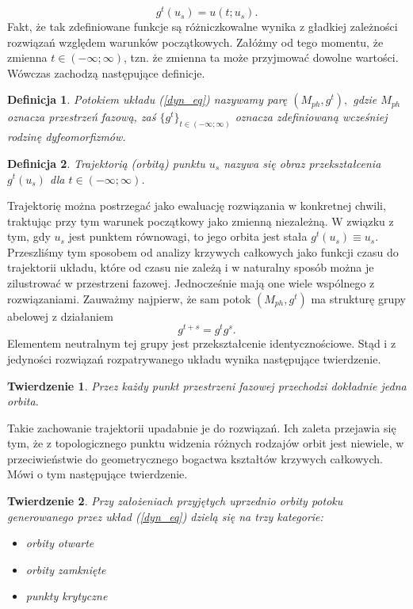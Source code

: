 \documentclass[12pt, twoside]{book}
\newtheorem{defi}{Definicja}
\newtheorem{tw}{Twierdzenie}
\begin{document}
\begin{equation}
	g^t(u_{s}) = u(t;u_{s}).
\end{equation}
Fakt, że tak zdefiniowane funkcje są różniczkowalne wynika z gładkiej zależności rozwiązań względem warunków początkowych. Załóżmy od tego momentu, że zmienna $ t \in (-\infty;\infty) $, tzn. że zmienna ta może przyjmować dowolne wartości. Wówczas zachodzą następujące definicje.
\begin{defi}
	Potokiem układu (\ref{dyn_eq}) nazywamy parę $ (M_{ph},g^t), $ gdzie $ M_{ph} $ oznacza przestrzeń fazową, zaś $ \{g^t\}_{t\in(-\infty;\infty)} $ oznacza zdefiniowaną wcześniej rodzinę dyfeomorfizmów.
\end{defi}
\begin{defi}
	Trajektorią (orbitą) punktu $ u_{s} $ nazywa się obraz przekształcenia $ g^t(u_{s}) $ dla $t\in(-\infty;\infty)  $.
\end{defi}
Trajektorię można postrzegać jako ewaluację rozwiązania w konkretnej chwili, traktując przy tym warunek początkowy jako zmienną niezależną. W związku z tym, gdy $ u_{s} $ jest punktem równowagi, to jego orbita jest stała $ g^t(u_{s}) \equiv u_{s}. $\newline
Przeszliśmy tym sposobem od analizy krzywych całkowych jako funkcji czasu do trajektorii układu, które od czasu nie zależą i w naturalny sposób można je zilustrować w przestrzeni fazowej. Jednocześnie mają one wiele wspólnego z rozwiązaniami. Zauważmy najpierw, że sam potok $ (M_{ph},g^t) $ ma strukturę grupy abelowej z działaniem
\begin{equation}
g^{t+s} = g^tg^s.
\end{equation}
Elementem neutralnym tej grupy jest przekształcenie identycznościowe. Stąd i z jedyności rozwiązań rozpatrywanego układu wynika następujące twierdzenie.
\begin{tw}
	Przez każdy punkt przestrzeni fazowej przechodzi dokładnie jedna orbita.
\end{tw}
Takie zachowanie trajektorii upadabnie je do rozwiązań. Ich zaleta przejawia się tym, że z topologicznego punktu widzenia różnych rodzajów orbit jest niewiele, w przeciwieństwie do geometrycznego bogactwa kształtów krzywych całkowych. Mówi o tym następujące twierdzenie.
\begin{tw}
	Przy założeniach przyjętych uprzednio orbity potoku generowanego przez układ (\ref{dyn_eq}) dzielą się na trzy kategorie:
	\begin{itemize}
		\item orbity otwarte
		\item orbity zamknięte
		\item punkty krytyczne
	\end{itemize}
\end{tw}
\end{document}
